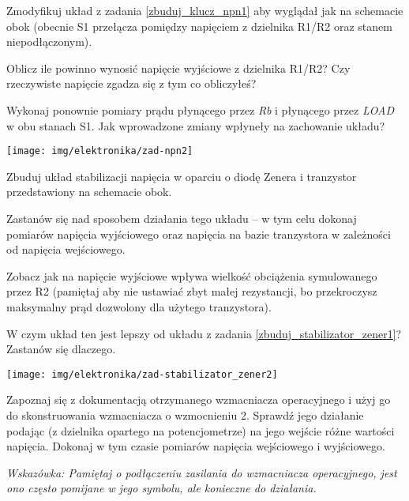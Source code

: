 \dbEntryCheckResults
\noindent\begin{minipage}[b]{0.5\textwidth}
Zmodyfikuj układ z zadania \ref{zbuduj_klucz_npn1} aby wyglądał jak na schemacie obok (obecnie S1 przełącza pomiędzy napięciem z dzielnika R1/R2 oraz stanem niepodłączonym).

Oblicz ile powinno wynosić napięcie wyjściowe z dzielnika R1/R2? Czy rzeczywiste napięcie zgadza się z tym co obliczyłeś?

Wykonaj ponownie pomiary prądu płynącego przez \textit{Rb} i płynącego przez \textit{LOAD} w obu stanach S1.
Jak wprowadzone zmiany wpłyneły na zachowanie układu?
\end{minipage}
\hfill
\begin{minipage}[b]{0.45\textwidth}
\texttt{[image: img/elektronika/zad-npn2]}
\end{minipage}
\fi


\dbEntryCheckResults
\noindent\begin{minipage}[b]{0.7\textwidth}
Zbuduj układ stabilizacji napięcia w oparciu o diodę Zenera i tranzystor przedstawiony na schemacie obok.

Zastanów się nad sposobem działania tego układu – w tym celu dokonaj pomiarów napięcia wyjściowego oraz napięcia na bazie tranzystora w zależności od napięcia wejściowego.

Zobacz jak na napięcie wyjściowe wpływa wielkość obciążenia symulowanego przez R2 (pamiętaj aby nie ustawiać zbyt małej rezystancji, bo przekroczysz maksymalny prąd dozwolony dla użytego tranzystora).

W czym układ ten jest lepszy od układu z zadania \ref{zbuduj_stabilizator_zener1}? Zastanów się dlaczego.
\end{minipage}
\hfill
\begin{minipage}[b]{0.25\textwidth}
\texttt{[image: img/elektronika/zad-stabilizator\_zener2]}
\end{minipage}
\fi


\dbEntryCheckResults
Zapoznaj się z dokumentacją otrzymanego wzmacniacza operacyjnego i użyj go do skonstruowania wzmacniacza o wzmocnieniu 2. Sprawdź jego działanie podając (z dzielnika opartego na potencjometrze) na jego wejście różne wartości napięcia. Dokonaj w tym czasie pomiarów napięcia wejściowego i wyjściowego.

\textit{Wskazówka: Pamiętaj o podłączeniu zasilania do wzmacniacza operacyjnego, jest ono często pomijane w jego symbolu, ale konieczne do działania.}
\fi
